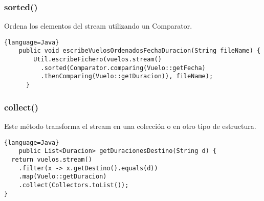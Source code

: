 \begin{center}
\subsubsection{sorted()}
Ordena los elementos del stream utilizando un Comparator.
\begin{lstlisting}{language=Java}
    public void escribeVuelosOrdenadosFechaDuracion(String fileName) {
        Util.escribeFichero(vuelos.stream()
          .sorted(Comparator.comparing(Vuelo::getFecha)
          .thenComparing(Vuelo::getDuracion)), fileName);
      }
\end{lstlisting}

\subsubsection{collect()}
Este método transforma el stream en una colección o en otro tipo de estructura.
\begin{lstlisting}{language=Java}
    public List<Duracion> getDuracionesDestino(String d) {
  return vuelos.stream()
    .filter(x -> x.getDestino().equals(d))
    .map(Vuelo::getDuracion)
    .collect(Collectors.toList());
}
\end{lstlisting}


\end{center}